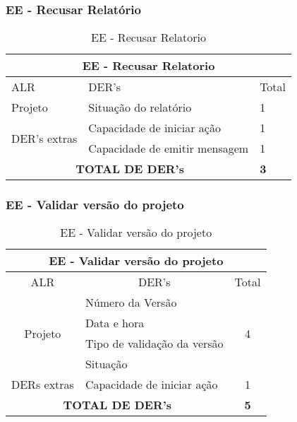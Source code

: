   \subsubsection{EE - Recusar Relatório }
    \begin{table}[!h]
\centering
\caption{EE - Recusar Relatorio}
\label{ee_recusar_relatorio_parcial}
\begin{tabular}{|l|l|l|}
\hline
\multicolumn{3}{|c|}{EE - Recusar Relatorio}           \\ \hline
ALR                      & DER's                      & Total         \\ \hline
Projeto                  & Situação do relatório      & 1             \\\hline
  \multirow{2}{*}{DER's extras} & Capacidade de iniciar ação             & 1 \\ \cline{2-3}
                 & Capacidade de emitir mensagem& 1 \\ \hline
\multicolumn{2}{|c|}{\textbf{TOTAL DE DER's}}                & \textbf{3} \\ \hline
\end{tabular}
\end{table}

  \subsubsection{EE - Validar versão do projeto}
   
      \begin{table}[!h]
      \centering
      \caption{EE - Validar versão do projeto}
      \label{ee_validar_versao_projeto}
      \begin{tabular}{|c|l|c|}
      \hline
      \multicolumn{3}{|c|}{EE - Validar versão do projeto}                        \\ \hline
      ALR                      & \multicolumn{1}{c|}{DER's}  & Total              \\ \hline
      \multirow{4}{*}{Projeto} & Número da Versão            & \multirow{4}{*}{4} \\ \cline{2-2}
			      & Data e hora                 &                    \\ \cline{2-2}
			      & Tipo de validação da versão &                    \\ \cline{2-2}
			      & Situação                    &                    \\ \hline
      DERs extras              & Capacidade de iniciar ação  & 1                  \\ \hline
      \multicolumn{2}{|c|}{\textbf{TOTAL DE DER's}}          & \textbf{5}         \\ \hline
      \end{tabular}
      \end{table}
   

